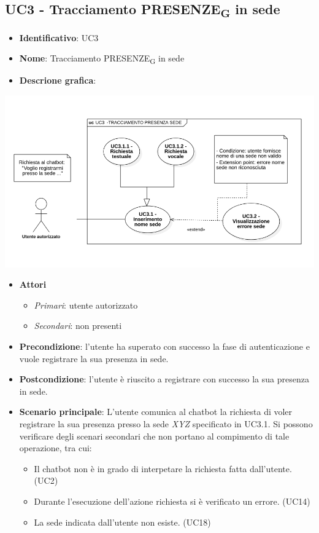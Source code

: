 \subsection{UC3 - Tracciamento PRESENZE\textsubscript{G} in sede}
\begin{itemize}
    \item \textbf{Identificativo}: UC3
    \item \textbf{Nome}: Tracciamento PRESENZE\textsubscript{G} in sede
    \item \textbf{Descrione grafica}:
\end{itemize}
\begin{center}
    \includegraphics[scale=0.50]{images/UC3.png} 
\end{center}
\begin{itemize}
    \item \textbf{Attori}
 \begin{itemize} 
    \item \textit{Primari}: utente autorizzato
    \item \textit{Secondari}: non presenti
 \end{itemize}
 \item \textbf{Precondizione}: l'utente ha superato con successo la fase di autenticazione e vuole registrare la sua presenza in sede. 
 \item \textbf{Postcondizione}: l'utente è riuscito a registrare con successo la sua presenza in sede. 
 \item \textbf{Scenario principale}: L'utente comunica al chatbot la richiesta di voler registrare la sua presenza presso la sede \textit{XYZ} specificato in UC3.1. Si possono verificare degli scenari secondari che non portano al compimento di tale operazione, tra cui:
    \begin{itemize}
        \item Il chatbot non è in grado di interpetare la richiesta fatta dall'utente. (UC2)
        \item Durante l'esecuzione dell'azione richiesta si è verificato un errore. (UC14)
        \item La sede indicata dall'utente non esiste. (UC18)
    \end{itemize}
\end{itemize}
\newpage

